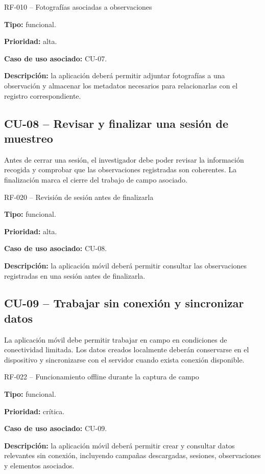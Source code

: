 \begin{requisitocard}{RF-010 -- Fotografías asociadas a observaciones}

\textbf{Tipo:} funcional.

\textbf{Prioridad:} alta.

\textbf{Caso de uso asociado:} CU-07.

\textbf{Descripción:} la aplicación deberá permitir adjuntar fotografías a una
observación y almacenar los metadatos necesarios para relacionarlas con el
registro correspondiente.

\end{requisitocard}

\subsection{CU-08 -- Revisar y finalizar una sesión de muestreo}

Antes de cerrar una sesión, el investigador debe poder revisar la información
recogida y comprobar que las observaciones registradas son coherentes. La
finalización marca el cierre del trabajo de campo asociado.

\begin{requisitocard}{RF-020 -- Revisión de sesión antes de finalizarla}

\textbf{Tipo:} funcional.

\textbf{Prioridad:} alta.

\textbf{Caso de uso asociado:} CU-08.

\textbf{Descripción:} la aplicación móvil deberá permitir consultar las
observaciones registradas en una sesión antes de finalizarla.

\end{requisitocard}

\subsection{CU-09 -- Trabajar sin conexión y sincronizar datos}

La aplicación móvil debe permitir trabajar en campo en condiciones de conectividad
limitada. Los datos creados localmente deberán conservarse en el dispositivo y
sincronizarse con el servidor cuando exista conexión disponible.

\begin{requisitocard}{RF-022 -- Funcionamiento offline durante la captura de campo}

\textbf{Tipo:} funcional.

\textbf{Prioridad:} crítica.

\textbf{Caso de uso asociado:} CU-09.

\textbf{Descripción:} la aplicación móvil deberá permitir crear y consultar datos
relevantes sin conexión, incluyendo campañas descargadas, sesiones, observaciones
y elementos asociados.

\end{requisitocard}

